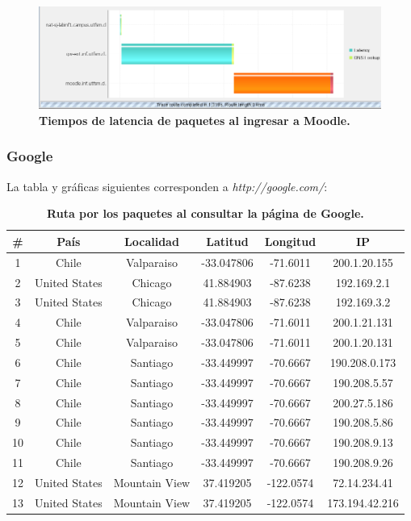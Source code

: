 \documentclass[12pt]{article}
\begin{document}
\begin{figure}[H] 
\centering 
\includegraphics[width=1\textwidth]{imagenes/moodle_grafica.png} \caption{\small \textbf{Tiempos de latencia de paquetes al ingresar a Moodle.}} 
\label{fig:diagrama_1} 
\end{figure}

\subsubsection{Google}
La tabla y gráficas siguientes corresponden a \emph{http://google.com/}:\\

\begin{table}[H]
\centering
\begin{tabular}{| c | c | c | c | c | c |}
\hline
\# & País & Localidad & Latitud & Longitud & IP\\
\hline
1 & Chile & Valparaiso & -33.047806 & -71.6011 & 200.1.20.155\\
\hline
2 & United States & Chicago & 41.884903 & -87.6238 & 192.169.2.1\\
\hline
3 & United States & Chicago & 41.884903 & -87.6238 & 192.169.3.2\\
\hline
4 & Chile & Valparaiso & -33.047806 & -71.6011 & 200.1.21.131\\
\hline
5 & Chile & Valparaiso & -33.047806 & -71.6011 & 200.1.20.131\\
\hline
6 & Chile & Santiago & -33.449997 & -70.6667 & 190.208.0.173\\
\hline
7 & Chile & Santiago & -33.449997 & -70.6667 & 190.208.5.57\\
\hline
8 & Chile & Santiago & -33.449997 & -70.6667 & 200.27.5.186\\
\hline
9 & Chile & Santiago & -33.449997 & -70.6667 & 190.208.5.86\\
\hline
10 & Chile & Santiago & -33.449997 & -70.6667 & 190.208.9.13\\
\hline
11 & Chile & Santiago & -33.449997 & -70.6667 & 190.208.9.26\\
\hline
12 & United States & Mountain View & 37.419205 & -122.0574 & 72.14.234.41\\
\hline
13 & United States & Mountain View & 37.419205 & -122.0574 & 173.194.42.216\\
\hline
\end{tabular}
\caption{\small \textbf{Ruta por los paquetes al consultar la página de Google.}}
\end{table}
\end{document}
